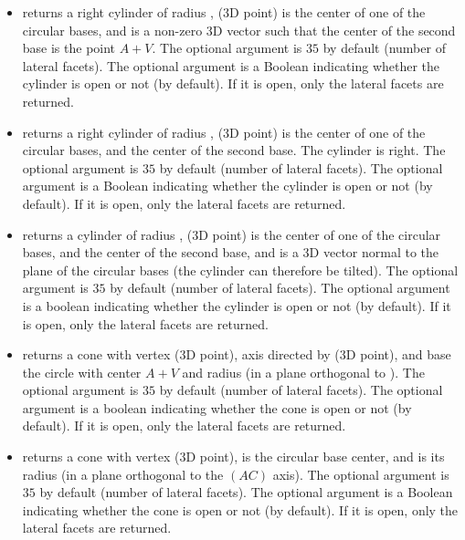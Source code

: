 \begin{itemize}
    \item {} returns a right cylinder of radius ,  (3D point) is the center of one of the circular bases, and  is a non-zero 3D vector such that the center of the second base is the point $A+V$. The optional argument  is $35$ by default (number of lateral facets). The optional argument  is a Boolean indicating whether the cylinder is open or not (\false by default). If it is open, only the lateral facets are returned.

    \item {} returns a right cylinder of radius ,  (3D point) is the center of one of the circular bases, and  the center of the second base. The cylinder is right. The optional argument  is $35$ by default (number of lateral facets). The optional argument  is a Boolean indicating whether the cylinder is open or not (\false by default). If it is open, only the lateral facets are returned.

    \item {} returns a cylinder of radius ,  (3D point) is the center of one of the circular bases, and  the center of the second base, and  is a 3D vector normal to the plane of the circular bases (the cylinder can therefore be tilted). The optional argument  is $35$ by default (number of lateral facets). The optional argument  is a boolean indicating whether the cylinder is open or not (\false by default). If it is open, only the lateral facets are returned.
    
    \item {} returns a cone with vertex  (3D point), axis  directed by  (3D point), and base the circle with center $A+V$ and radius  (in a plane orthogonal to ). The optional argument  is $35$ by default (number of lateral facets). The optional argument  is a boolean indicating whether the cone is open or not (\false by default). If it is open, only the lateral facets are returned.

    \item {} returns a cone with vertex  (3D point),  is the circular base center, and  is its radius (in a plane orthogonal to the $(AC)$ axis). The optional argument  is $35$ by default (number of lateral facets). The optional argument  is a Boolean indicating whether the cone is open or not (\false by default). If it is open, only the lateral facets are returned.


\end{itemize}
